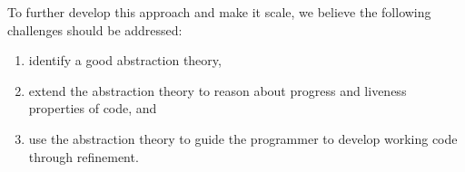 To further develop this approach and make it scale, we believe the following challenges should be addressed:
\begin{enumerate}[topsep=0pt,noitemsep]
\item identify a good abstraction theory,
\item extend the abstraction theory to reason about progress and liveness properties of code, and 
\item use the abstraction theory to guide the programmer to develop working code through refinement.
\end{enumerate} 







